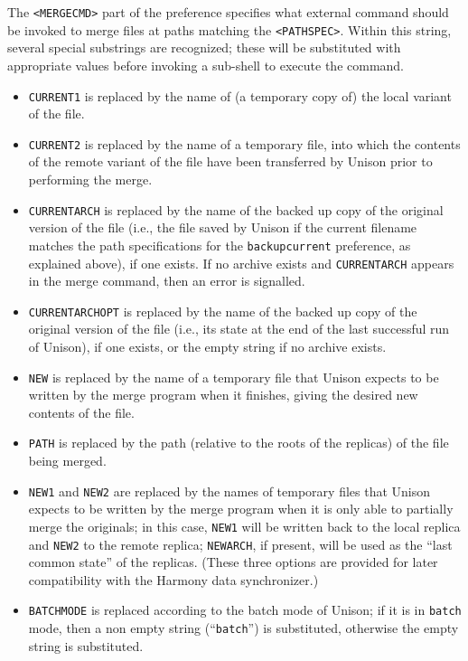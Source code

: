 \documentclass{article}
\begin{document}
The \verb|<MERGECMD>| part of the preference specifies what external command
should be invoked to merge files at paths matching the \verb|<PATHSPEC>|.
Within this string, several special substrings are recognized; these will be
substituted with appropriate values before invoking a sub-shell to execute
the command.
\begin{itemize}
\item \relax\verb|CURRENT1| is replaced by the name of (a temporary copy of)
  the local variant of the file.
\item \relax\verb|CURRENT2| is replaced by the name of a temporary
  file, into which the contents of the remote variant of the file have
  been transferred by Unison prior to performing the merge.
\item \relax\verb|CURRENTARCH| is replaced by the name of the backed up copy
  of the original version of the file (i.e., the file saved by Unison
  if the current filename matches the path specifications for the
  \verb|backupcurrent| preference, as explained above), if one exists.
  If no archive exists and \relax\verb|CURRENTARCH| appears in the
  merge command, then an error is signalled.
\item \relax\verb|CURRENTARCHOPT| is replaced by the name of the backed up copy
  of the original version of the file (i.e., its state at the end of
  the last successful run of Unison), if one exists, or the empty
  string if no archive exists.
\item \relax\verb|NEW| is replaced by the name of a temporary file
  that Unison expects to be written by the merge program when it
  finishes, giving the desired new contents of the file.
\item \relax\verb|PATH| is replaced by the path (relative to the roots of
  the replicas) of the file being merged.
\item \relax\verb|NEW1| and \relax\verb|NEW2| are replaced by the names of temporary files
  that Unison expects to be written by the merge program when it
  is only able to partially merge the originals; in this case, \verb|NEW1|
  will be written back to the local replica and \verb|NEW2| to the remote
  replica; \verb|NEWARCH|, if present, will be used as the ``last common
  state'' of the replicas.  (These three options are provided for
  later compatibility with the Harmony data synchronizer.)
\item \relax\verb|BATCHMODE| is replaced according to the batch mode of
  Unison; if it is in \texttt{batch} mode, then a non empty string
  (``\verb|batch|'') is substituted, otherwise the empty string is substituted.
\end{itemize}
\end{document}
